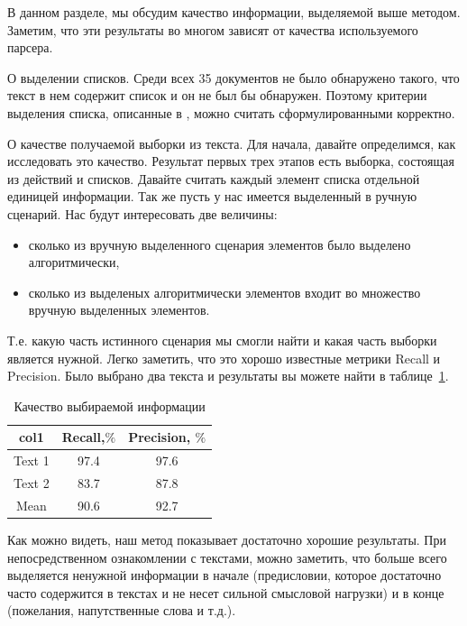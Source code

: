 \documentclass[12pt]{article}
\begin{document}
В данном разделе, мы обсудим качество информации, выделяемой выше методом. Заметим, что эти результаты во многом зависят от качества используемого парсера.

О выделении списков. Среди всех 35 документов не было обнаружено такого, что текст в нем содержит список и он не был бы обнаружен. Поэтому критерии выделения списка, описанные в , можно считать сформулированными корректно.

О качестве получаемой выборки из текста. Для начала, давайте определимся, как исследовать это качество. Результат первых трех этапов есть выборка, состоящая из действий и списков. Давайте считать каждый элемент списка отдельной единицей информации. Так же пусть у нас имеется выделенный в ручную сценарий. Нас будут интересовать две величины:
\begin{itemize}
	\item сколько из вручную выделенного сценария элементов было выделено алгоритмически,
	\item сколько из выделеных алгоритмически элементов входит во множество вручную выделенных элементов.
\end{itemize}

Т.е. какую часть истинного сценария мы смогли найти и какая часть выборки является нужной. Легко заметить, что это хорошо известные метрики Recall и Precision. Было выбрано два текста и результаты вы можете найти в таблице~\ref{table:1}.

\begin{table}[h!]
\centering
\begin{tabular}{||c |c |c||} 
 \hline
  col1& Recall,$\%$ & Precision, $\%$\\
 \hline
 Text 1 &  97.4&  97.6\\ 
 Text 2 &  83.7&  87.8\\
 \hline
 Mean & 90.6& 92.7\\
 \hline
\end{tabular}
\caption{Качество выбираемой информации}
\label{table:1}
\end{table}

Как можно видеть, наш метод показывает достаточно хорошие результаты. При непосредственном ознакомлении с текстами, можно заметить, что больше всего выделяется ненужной информации в начале (предисловии, которое достаточно часто содержится в текстах и не несет сильной смысловой нагрузки) и в конце (пожелания, напутственные слова и т.д.).
\end{document}
